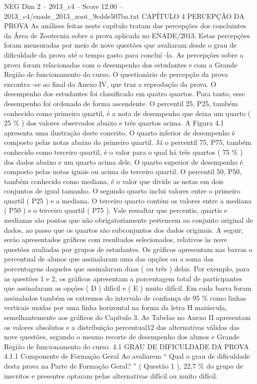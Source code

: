 \begin{textsample}{NEG Dim 2 – 2013\_c4 – Score 12.00 – 2013\_c4/enade\_2013\_zoot\_9cdde507ba.txt}  \label{ex:f2_neg_373}
CAPÍTULO 4 PERCEPÇÃO DA PROVA As análises feitas neste capítulo tratam das percepções dos concluintes da Área de Zootecnia sobre a prova aplicada no ENADE/2013.
Estas percepções foram mensuradas por meio de nove questões que avaliaram desde o grau de dificuldade da prova até o tempo gasto para concluí -la.
As percepções sobre a prova foram relacionadas com o desempenho dos estudantes e com a Grande Região de funcionamento do curso.
O questionário de percepção da prova encontra -se ao final do Anexo IV, que traz a reprodução da prova.
O desempenho dos estudantes foi classificado em quatro quartos.
Para tanto, esse desempenho foi ordenado de forma ascendente.
O percentil 25, P25, também conhecido como primeiro quartil, é a nota de desempenho que deixa um quarto ( 25 \% ) dos valores observados abaixo e três quartos acima.
A Figura 4.1 apresenta uma ilustração deste conceito.
O quarto inferior de desempenho é composto pelas notas abaixo do primeiro quartil.
Já o percentil 75, P75, também conhecido como terceiro quartil, é o valor para o qual há três quartos ( 75 \% ) dos dados abaixo e um quarto acima dele.
O quarto superior de desempenho é composto pelas notas iguais ou acima do terceiro quartil.
O percentil 50, P50, também conhecido como mediana, é o valor que divide as notas em dois conjuntos de igual tamanho.
O segundo quarto inclui valores entre o primeiro quartil ( P25 ) e a mediana.
O terceiro quarto contém os valores entre a mediana ( P50 ) e o terceiro quartil ( P75 ).
Vale ressaltar que percentis, quartis e medianas são pontos que não obrigatoriamente pertencem ao conjunto original de dados, ao passo que os quartos são subconjuntos dos dados originais.
A seguir, serão apresentados gráficos com resultados selecionados, relativos às nove questões avaliadas por grupos de estudantes.
Os gráficos apresentam nas barras o percentual de alunos que assinalaram uma das opções ou a soma das porcentagens daqueles que assinalaram duas ( ou três ) delas.
Por exemplo, para as questões 1 e 2, os gráficos apresentam a porcentagem total de participantes que assinalaram as opções ( D ) difícil e ( E ) muito difícil.
Em cada barra foram assinalados também os extremos do intervalo de confiança de 95 \% como linhas verticais unidas por uma linha horizontal na forma da letra H maiúscula, semelhantemente aos gráficos do Capítulo 3.
As Tabelas no Anexo II apresentam os valores absolutos e a distribuição percentual12 das alternativas válidas das nove questões, segundo o mesmo recorte de desempenho dos alunos e Grande Região de funcionamento do curso. 4.1 GRAU DE DIFICULDADE DA PROVA 4.1.1 Componente de Formação Geral Ao avaliarem “ Qual o grau de dificuldade desta prova na Parte de Formação Geral? ” ( Questão 1 ), 22,7 \% do grupo de inscritos e presentes optaram pelas alternativas difícil ou muito difícil.

\end{textsample}
